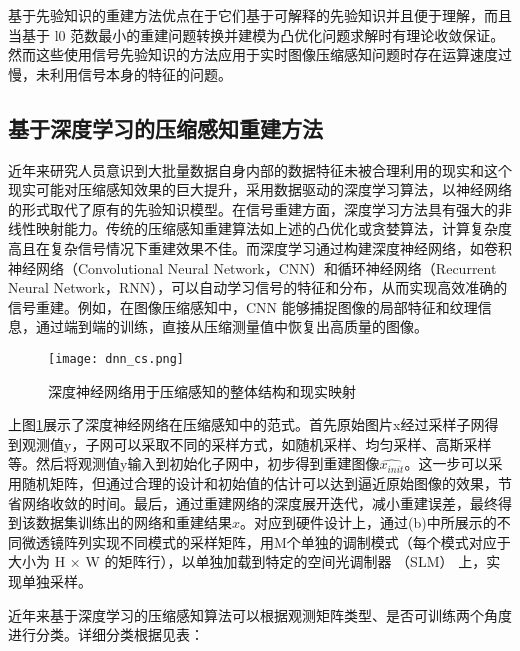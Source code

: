 基于先验知识的重建方法优点在于它们基于可解释的先验知识并且便于理解，而且当基于 l0 范数最小的重建问题转换并建模为凸优化问题求解时有理论收敛保证。然而这些使用信号先验知识的方法应用于实时图像压缩感知问题时存在运算速度过慢，未利用信号本身的特征的问题。

\subsection{基于深度学习的压缩感知重建方法}
近年来研究人员意识到大批量数据自身内部的数据特征未被合理利用的现实和这个现实可能对压缩感知效果的巨大提升，采用数据驱动的深度学习算法，以神经网络的形式取代了原有的先验知识模型。在信号重建方面，深度学习方法具有强大的非线性映射能力。传统的压缩感知重建算法如上述的凸优化或贪婪算法，计算复杂度高且在复杂信号情况下重建效果不佳。而深度学习通过构建深度神经网络，如卷积神经网络（Convolutional Neural Network，CNN）\citep{Neocognitron,LeNet,AlexNet,ZFNet}和循环神经网络（Recurrent Neural Network，RNN）\citep{Hopfield,Elman,BPTT}，可以自动学习信号的特征和分布，从而实现高效准确的信号重建。例如，在图像压缩感知中，CNN 能够捕捉图像的局部特征和纹理信息，通过端到端的训练，直接从压缩测量值中恢复出高质量的图像。

\begin{figure}[ht]
  \centering
  \texttt{[image: dnn\_cs.png]}
  \caption{深度神经网络用于压缩感知的整体结构和现实映射\cite{Practical_compact_deep_compressed_sensing}}
  \label{fig:dnn_cs}
\end{figure}

上图\ref{fig:dnn_cs}展示了深度神经网络在压缩感知中的范式。首先原始图片x经过采样子网得到观测值y，子网可以采取不同的采样方式，如随机采样、均匀采样、高斯采样等。然后将观测值y输入到初始化子网中，初步得到重建图像$\hat{x_{init}}$。这一步可以采用随机矩阵，但通过合理的设计和初始值的估计可以达到逼近原始图像的效果，节省网络收敛的时间。最后，通过重建网络的深度展开迭代，减小重建误差，最终得到该数据集训练出的网络和重建结果$\hat{x}$。对应到硬件设计上，通过(b)中所展示的不同微透镜阵列实现不同模式的采样矩阵，用M个单独的调制模式（每个模式对应于大小为 H × W 的矩阵行），以单独加载到特定的空间光调制器 （SLM） 上，实现单独采样。

近年来基于深度学习的压缩感知算法可以根据观测矩阵类型、是否可训练两个角度进行分类。详细分类根据\cite{Practical_compact_deep_compressed_sensing}见表：


